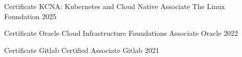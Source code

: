 

\begin{cvhonors}

\cvhonor
  {Certificate} %
  {KCNA: Kubernetes and Cloud Native Associate} %
  {The Linux Foundation} %
  {2025} %


\cvhonor
  {Certificate} %
  {Oracle Cloud Infrastructure Foundations Associate} %
  {Oracle} %
  {2022} %



  \cvhonor
    {Certificate} %
    {Gitlab Certified Associate} %
    {Gitlab} %
    {2021} %




\end{cvhonors}

